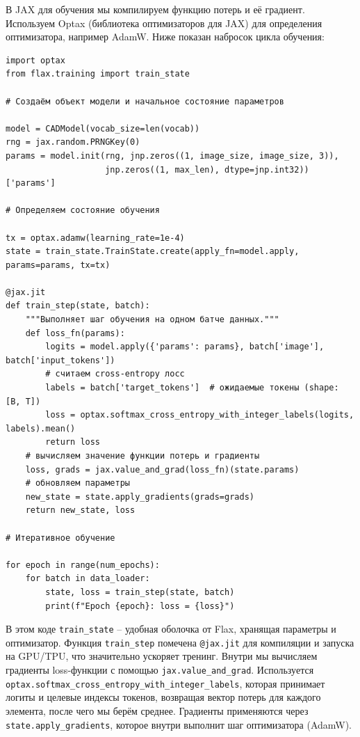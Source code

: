 \documentclass{article}
\begin{document}
В JAX для обучения мы компилируем функцию потерь и её градиент. Используем Optax (библиотека оптимизаторов для JAX) для определения оптимизатора, например AdamW. Ниже показан набросок цикла обучения:

\begin{lstlisting}
import optax
from flax.training import train_state

# Создаём объект модели и начальное состояние параметров

model = CADModel(vocab_size=len(vocab))
rng = jax.random.PRNGKey(0)
params = model.init(rng, jnp.zeros((1, image_size, image_size, 3)),
                    jnp.zeros((1, max_len), dtype=jnp.int32))['params']

# Определяем состояние обучения

tx = optax.adamw(learning_rate=1e-4)
state = train_state.TrainState.create(apply_fn=model.apply, params=params, tx=tx)

@jax.jit
def train_step(state, batch):
    """Выполняет шаг обучения на одном батче данных."""
    def loss_fn(params):
        logits = model.apply({'params': params}, batch['image'], batch['input_tokens'])
        # считаем cross-entropy лосс
        labels = batch['target_tokens']  # ожидаемые токены (shape: [B, T])
        loss = optax.softmax_cross_entropy_with_integer_labels(logits, labels).mean()
        return loss
    # вычисляем значение функции потерь и градиенты
    loss, grads = jax.value_and_grad(loss_fn)(state.params)
    # обновляем параметры
    new_state = state.apply_gradients(grads=grads)
    return new_state, loss

# Итеративное обучение

for epoch in range(num_epochs):
    for batch in data_loader:
        state, loss = train_step(state, batch)
        print(f"Epoch {epoch}: loss = {loss}")
\end{lstlisting}

В этом коде \texttt{train_state} – удобная оболочка от Flax, хранящая параметры и оптимизатор. Функция \texttt{train_step} помечена \texttt{@jax.jit} для компиляции и запуска на GPU/TPU, что значительно ускоряет тренинг. Внутри мы вычисляем градиенты loss-функции с помощью \texttt{jax.value_and_grad}. Используется \texttt{optax.softmax_cross_entropy_with_integer_labels}, которая принимает логиты и целевые индексы токенов, возвращая вектор потерь для каждого элемента, после чего мы берём среднее. Градиенты применяются через \texttt{state.apply_gradients}, которое внутри выполнит шаг оптимизатора (AdamW).
\end{document}
